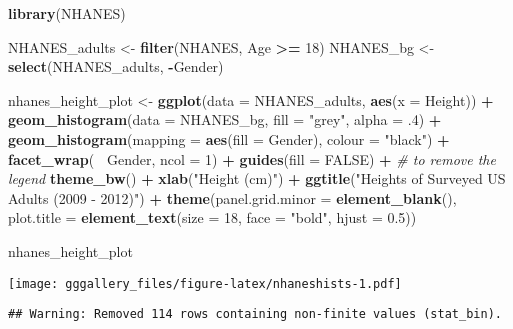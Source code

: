 \documentclass[]{book}
\newenvironment{Shaded}{\begin{snugshade}}{\end{snugshade}}
\newcommand{\CommentTok}[1]{\textcolor[rgb]{0.56,0.35,0.01}{\textit{#1}}}
\newcommand{\DataTypeTok}[1]{\textcolor[rgb]{0.13,0.29,0.53}{#1}}
\newcommand{\DecValTok}[1]{\textcolor[rgb]{0.00,0.00,0.81}{#1}}
\newcommand{\FloatTok}[1]{\textcolor[rgb]{0.00,0.00,0.81}{#1}}
\newcommand{\KeywordTok}[1]{\textcolor[rgb]{0.13,0.29,0.53}{\textbf{#1}}}
\newcommand{\NormalTok}[1]{#1}
\newcommand{\OperatorTok}[1]{\textcolor[rgb]{0.81,0.36,0.00}{\textbf{#1}}}
\newcommand{\OtherTok}[1]{\textcolor[rgb]{0.56,0.35,0.01}{#1}}
\newcommand{\StringTok}[1]{\textcolor[rgb]{0.31,0.60,0.02}{#1}}
\begin{document}
\begin{Shaded}
\begin{Highlighting}[]
\KeywordTok{library}\NormalTok{(NHANES)}

\NormalTok{NHANES_adults <-}\StringTok{ }\KeywordTok{filter}\NormalTok{(NHANES, Age }\OperatorTok{>=}\StringTok{ }\DecValTok{18}\NormalTok{) }
\NormalTok{NHANES_bg <-}\StringTok{ }\KeywordTok{select}\NormalTok{(NHANES_adults, }\OperatorTok{-}\NormalTok{Gender) }


\NormalTok{nhanes_height_plot <-}\StringTok{ }\KeywordTok{ggplot}\NormalTok{(}\DataTypeTok{data =}\NormalTok{ NHANES_adults, }\KeywordTok{aes}\NormalTok{(}\DataTypeTok{x =}\NormalTok{ Height)) }\OperatorTok{+}
\StringTok{  }\KeywordTok{geom_histogram}\NormalTok{(}\DataTypeTok{data =}\NormalTok{ NHANES_bg, }\DataTypeTok{fill =} \StringTok{"grey"}\NormalTok{, }\DataTypeTok{alpha =} \FloatTok{.4}\NormalTok{) }\OperatorTok{+}
\StringTok{  }\KeywordTok{geom_histogram}\NormalTok{(}\DataTypeTok{mapping =} \KeywordTok{aes}\NormalTok{(}\DataTypeTok{fill =}\NormalTok{ Gender), }\DataTypeTok{colour =} \StringTok{"black"}\NormalTok{) }\OperatorTok{+}
\StringTok{  }\KeywordTok{facet_wrap}\NormalTok{(}\OperatorTok{~}\StringTok{ }\NormalTok{Gender, }\DataTypeTok{ncol =} \DecValTok{1}\NormalTok{) }\OperatorTok{+}
\StringTok{  }\KeywordTok{guides}\NormalTok{(}\DataTypeTok{fill =} \OtherTok{FALSE}\NormalTok{) }\OperatorTok{+}\StringTok{  }\CommentTok{# to remove the legend}
\StringTok{  }\KeywordTok{theme_bw}\NormalTok{() }\OperatorTok{+}\StringTok{ }\KeywordTok{xlab}\NormalTok{(}\StringTok{"Height (cm)"}\NormalTok{) }\OperatorTok{+}\StringTok{ }\KeywordTok{ggtitle}\NormalTok{(}\StringTok{"Heights of Surveyed US Adults (2009 - 2012)"}\NormalTok{)  }\OperatorTok{+}\StringTok{ }
\StringTok{  }\KeywordTok{theme}\NormalTok{(}\DataTypeTok{panel.grid.minor =} \KeywordTok{element_blank}\NormalTok{(), }
        \DataTypeTok{plot.title =} \KeywordTok{element_text}\NormalTok{(}\DataTypeTok{size =} \DecValTok{18}\NormalTok{, }\DataTypeTok{face =} \StringTok{"bold"}\NormalTok{, }\DataTypeTok{hjust =} \FloatTok{0.5}\NormalTok{))}
  

\NormalTok{nhanes_height_plot}
\end{Highlighting}
\end{Shaded}

\texttt{[image: gggallery\_files/figure-latex/nhaneshists-1.pdf]}

\begin{verbatim}
## Warning: Removed 114 rows containing non-finite values (stat_bin).
\end{verbatim}
\end{document}
